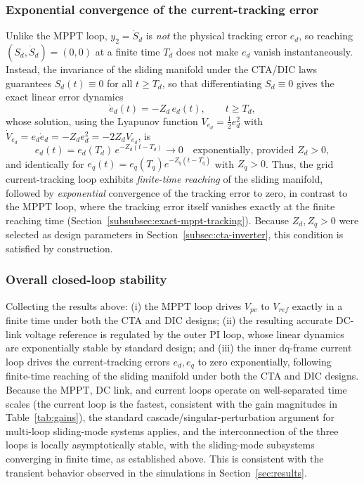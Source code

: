 \documentclass[preprint,12pt]{elsarticle}
\begin{document}
\subsubsection{Exponential convergence of the current-tracking error}
\label{subsubsec:exp-convergence-current}

Unlike the MPPT loop, $y_2=\dot S_d$ is \emph{not} the physical tracking error $e_d$, so reaching $(S_d,\dot S_d)=(0,0)$ at a finite time $T_d$ does not make $e_d$ vanish instantaneously. Instead, the invariance of the sliding manifold under the CTA/DIC laws guarantees $S_d(t)\equiv 0$ for all $t \geq T_d$, so that differentiating $S_d\equiv 0$ gives the exact linear error dynamics
\begin{equation}
    \dot e_d(t) = -Z_d\,e_d(t), \qquad t \geq T_d,
    \label{eq:ed-reduced}
\end{equation}
whose solution, using the Lyapunov function $V_{e_d}=\tfrac{1}{2}e_d^2$ with $\dot V_{e_d} = e_d\dot e_d = -Z_de_d^2 = -2Z_dV_{e_d}$, is
\begin{equation}
    e_d(t) = e_d(T_d)\,e^{-Z_d(t-T_d)} \longrightarrow 0 \quad \text{exponentially, provided } Z_d>0,
    \label{eq:ed-exponential}
\end{equation}
and identically for $e_q(t) = e_q(T_q)e^{-Z_q(t-T_q)}$ with $Z_q>0$. Thus, the grid current-tracking loop exhibits \emph{finite-time reaching} of the sliding manifold, followed by \emph{exponential} convergence of the tracking error to zero, in contrast to the MPPT loop, where the tracking error itself vanishes exactly at the finite reaching time (Section~\ref{subsubsec:exact-mppt-tracking}). Because $Z_d, Z_q > 0$ were selected as design parameters in Section~\ref{subsec:cta-inverter}, this condition is satisfied by construction.

\subsubsection{Overall closed-loop stability}
\label{subsubsec:overall-stability}

Collecting the results above: (i) the MPPT loop drives $V_{pv}$ to $V_{ref}$ exactly in a finite time under both the CTA and DIC designs; (ii) the resulting accurate DC-link voltage reference is regulated by the outer PI loop, whose linear dynamics are exponentially stable by standard design; and (iii) the inner dq-frame current loop drives the current-tracking errors $e_d, e_q$ to zero exponentially, following finite-time reaching of the sliding manifold under both the CTA and DIC designs. Because the MPPT, DC link, and current loops operate on well-separated time scales (the current loop is the fastest, consistent with the gain magnitudes in Table~\ref{tab:gains}), the standard cascade/singular-perturbation argument for multi-loop sliding-mode systems applies, and the interconnection of the three loops is locally asymptotically stable, with the sliding-mode subsystems converging in finite time, as established above. This is consistent with the transient behavior observed in the simulations in Section~\ref{sec:results}.
\end{document}
